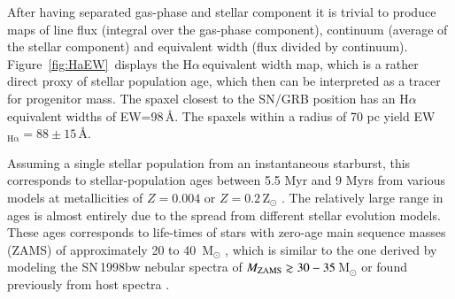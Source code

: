 \documentclass[traditabstract]{aa}
\newcommand{\ha}{H$\alpha$}
\begin{document}
After having separated gas-phase and stellar component it is trivial to produce maps of line flux (integral over the gas-phase component), continuum (average of the stellar component) and equivalent width (flux divided by continuum). Figure~\ref{fig:HaEW}~displays the \ha\,equivalent width map, which is a rather direct proxy of stellar population age, which then can be interpreted as a tracer for progenitor mass. %
The spaxel closest to the SN/GRB position has an \ha\,equivalent widths of EW=98\,\AA. The spaxels within a radius of 70 pc yield EW$_{\mathrm{H\alpha}}=88\pm15$\,\AA. 

Assuming a single stellar population from an instantaneous starburst, this corresponds to stellar-population ages between 5.5 Myr and 9 Myrs from various models at metallicities of $Z=0.004$ or $Z=0.2$\,Z$_{\odot}$ \citep[see e.g.,][and references therein]{2016arXiv160703446K}. The relatively large range in ages is almost entirely due to the spread from different stellar evolution models. These ages corresponds to life-times of stars with zero-age main sequence masses (ZAMS) of approximately 20 to 40~M$_{\odot}$ \citep{1994A&AS..105...29F, 2005A&A...429..581M}, which is similar to the one derived by modeling the SN\,1998bw nebular spectra of $M_{\rm{ZAMS}} \gtrsim 30-35$\,M$_{\odot}$ \citep{2006ApJ...640..854M} or found previously from host spectra \citep{2005NewA...11..103S}.
\end{document}
